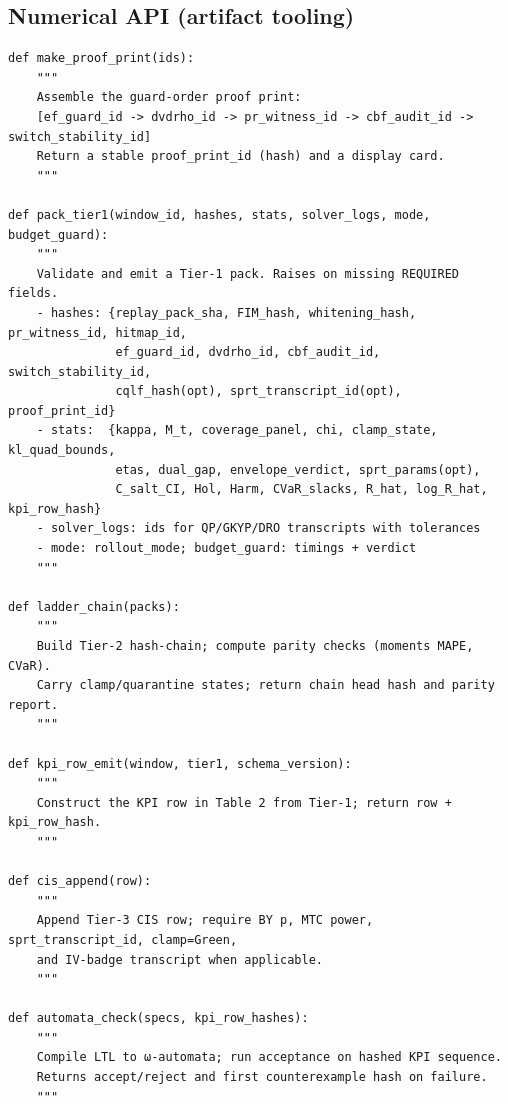 \subsection{Numerical API (artifact tooling)}\label{subsec:api-artifacts}
\emph{}
\begin{lstlisting}
def make_proof_print(ids):
    """
    Assemble the guard-order proof print:
    [ef_guard_id -> dvdrho_id -> pr_witness_id -> cbf_audit_id -> switch_stability_id]
    Return a stable proof_print_id (hash) and a display card.
    """

def pack_tier1(window_id, hashes, stats, solver_logs, mode, budget_guard):
    """
    Validate and emit a Tier-1 pack. Raises on missing REQUIRED fields.
    - hashes: {replay_pack_sha, FIM_hash, whitening_hash, pr_witness_id, hitmap_id,
               ef_guard_id, dvdrho_id, cbf_audit_id, switch_stability_id,
               cqlf_hash(opt), sprt_transcript_id(opt), proof_print_id}
    - stats:  {kappa, M_t, coverage_panel, chi, clamp_state, kl_quad_bounds,
               etas, dual_gap, envelope_verdict, sprt_params(opt),
               C_salt_CI, Hol, Harm, CVaR_slacks, R_hat, log_R_hat, kpi_row_hash}
    - solver_logs: ids for QP/GKYP/DRO transcripts with tolerances
    - mode: rollout_mode; budget_guard: timings + verdict
    """

def ladder_chain(packs):
    """
    Build Tier-2 hash-chain; compute parity checks (moments MAPE, CVaR).
    Carry clamp/quarantine states; return chain head hash and parity report.
    """

def kpi_row_emit(window, tier1, schema_version):
    """
    Construct the KPI row in Table 2 from Tier-1; return row + kpi_row_hash.
    """

def cis_append(row):
    """
    Append Tier-3 CIS row; require BY p, MTC power, sprt_transcript_id, clamp=Green,
    and IV-badge transcript when applicable.
    """

def automata_check(specs, kpi_row_hashes):
    """
    Compile LTL to ω-automata; run acceptance on hashed KPI sequence.
    Returns accept/reject and first counterexample hash on failure.
    """
\end{lstlisting}

